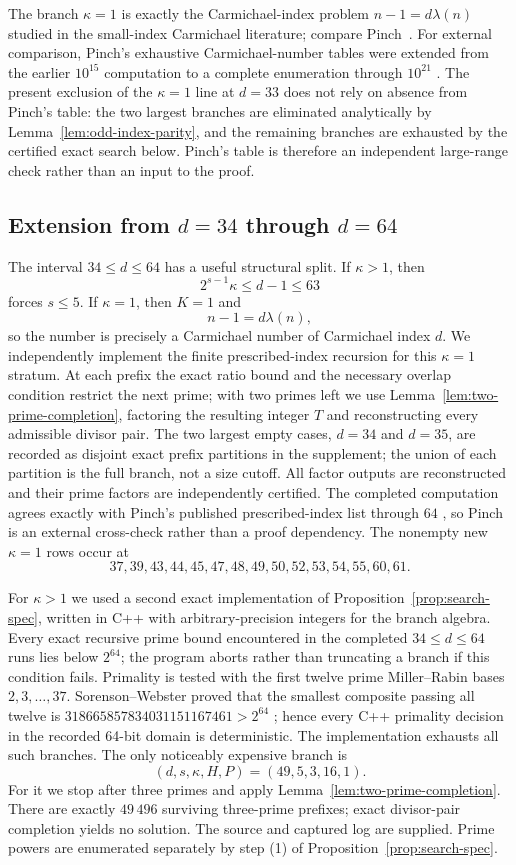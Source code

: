 \documentclass[11pt]{article}
\begin{document}
The branch $\kappa=1$ is exactly the Carmichael-index problem
$n-1=d\lambda(n)$ studied in the small-index Carmichael literature; compare
Pinch~\cite{PinchSmallIndex}.  For external comparison, Pinch's exhaustive
Carmichael-number tables were extended from the earlier $10^{15}$ computation
to a complete enumeration through $10^{21}$ \cite{Pinch2007}.  The present exclusion of the
$\kappa=1$ line at $d=33$ does not rely on absence from Pinch's table:
the two largest branches are eliminated analytically by
Lemma~\ref{lem:odd-index-parity}, and the remaining branches are exhausted by
the certified exact search below.  Pinch's table is therefore an independent
large-range check rather than an input to the proof.


\subsection{Extension from $d=34$ through $d=64$}
\label{subsec:d64}

The interval $34\le d\le64$ has a useful structural split.
If $\kappa>1$, then
\[
2^{s-1}\kappa\le d-1\le63
\]
forces $s\le5$.  If $\kappa=1$, then $K=1$ and
\[
n-1=d\lambda(n),
\]
so the number is precisely a Carmichael number of Carmichael index $d$.
We independently implement the finite prescribed-index recursion for this
$\kappa=1$ stratum.  At each prefix the exact ratio bound and the necessary
overlap condition restrict the next prime; with two primes left we use
Lemma~\ref{lem:two-prime-completion}, factoring the resulting integer $T$
and reconstructing every admissible divisor pair.  The two largest empty
cases, $d=34$ and $d=35$, are recorded as disjoint exact prefix partitions in
the supplement; the union of each partition is the full branch, not a size
cutoff.  All factor outputs are reconstructed and their prime factors are
independently certified.  The completed computation agrees exactly with
Pinch's published prescribed-index list through $64$ \cite{PinchSmallIndex},
so Pinch is an external cross-check rather than a proof dependency.  The
nonempty new $\kappa=1$ rows occur at
\[
37,39,43,44,45,47,48,49,50,52,53,54,55,60,61.
\]

For $\kappa>1$ we used a second exact implementation of
Proposition~\ref{prop:search-spec}, written in C++ with arbitrary-precision
integers for the branch algebra.  Every exact recursive prime bound encountered
in the completed $34\le d\le64$ runs lies below $2^{64}$; the program aborts
rather than truncating a branch if this condition fails.  Primality is tested
with the first twelve prime Miller--Rabin bases $2,3,\ldots,37$.
Sorenson--Webster proved that the smallest composite passing all twelve is
$318665857834031151167461>2^{64}$ \cite{SorensonWebster2017}; hence every
C++ primality decision in the recorded 64-bit domain is deterministic.  The
implementation exhausts all such branches.  The only noticeably expensive
branch is
\[
(d,s,\kappa,H,P)=(49,5,3,16,1).
\]
For it we stop after three primes and apply Lemma~\ref{lem:two-prime-completion}.
There are exactly $49\,496$ surviving three-prime prefixes; exact divisor-pair
completion yields no solution.  The source and captured log are supplied.
Prime powers are enumerated separately by step (1) of
Proposition~\ref{prop:search-spec}.
\end{document}
